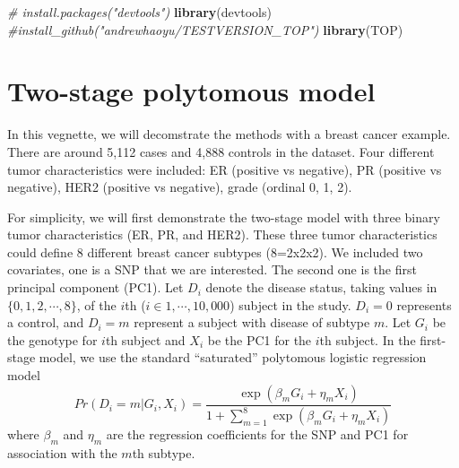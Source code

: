\documentclass[11pt,]{article}
\newenvironment{Shaded}{\begin{snugshade}}{\end{snugshade}}
\newcommand{\KeywordTok}[1]{\textcolor[rgb]{0.13,0.29,0.53}{\textbf{#1}}}
\newcommand{\CommentTok}[1]{\textcolor[rgb]{0.56,0.35,0.01}{\textit{#1}}}
\newcommand{\NormalTok}[1]{#1}
\begin{document}
\begin{Shaded}
\begin{Highlighting}[]
\CommentTok{# install.packages("devtools")}
\KeywordTok{library}\NormalTok{(devtools)  }
\CommentTok{#install_github("andrewhaoyu/TESTVERSION_TOP")}
\KeywordTok{library}\NormalTok{(TOP)}
\end{Highlighting}
\end{Shaded}

\section{Two-stage polytomous model}\label{two-stage-polytomous-model}

In this vegnette, we will decomstrate the methods with a breast cancer
example. There are around 5,112 cases and 4,888 controls in the dataset.
Four different tumor characteristics were included: ER (positive vs
negative), PR (positive vs negative), HER2 (positive vs negative), grade
(ordinal 0, 1, 2).

For simplicity, we will first demonstrate the two-stage model with three
binary tumor characteristics (ER, PR, and HER2). These three tumor
characteristics could define 8 different breast cancer subtypes
(8=2x2x2). We included two covariates, one is a SNP that we are
interested. The second one is the first principal component (PC1). Let
\(D_{i}\) denote the disease status, taking values in
\(\{0,1,2,\cdots,8\}\), of the \(i\)th (\(i \in 1, \cdots, 10,000\))
subject in the study. \(D_{i}=0\) represents a control, and \(D_{i}=m\)
represent a subject with disease of subtype \(m\). Let \(G_i\) be the
genotype for \(i\)th subject and \(X_i\) be the PC1 for the \(i\)th
subject. In the first-stage model, we use the standard ``saturated''
polytomous logistic regression model
\[ Pr(D_{i}=m|G_i,X_{i})=\frac{\exp(\beta_m G_i+\eta_m X_i)}{1+\sum_{m=1}^{8}\exp(\beta_m G_i+\eta_{m}X_{i})}\]
where \(\beta_{m}\) and \(\eta_{m}\) are the regression coefficients for
the SNP and PC1 for association with the \(m\)th subtype.
\end{document}
